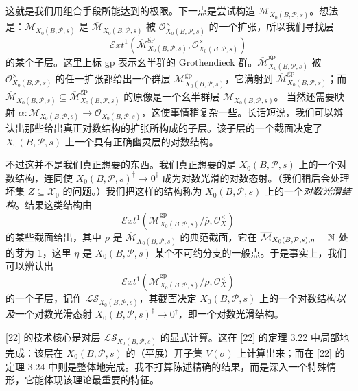 这就是我们用组合手段所能达到的极限。下一点是尝试构造 $\mathcal M_{X_0(B,\mathcal P,s)}$。想法是：$\mathcal M_{X_0(B,\mathcal P,s)}$ 是 $\overline{\mathcal M}_{X_0(B,\mathcal P,s)}$ 被 $\mathcal O^\times_{X_0(B,\mathcal P,s)}$ 的一个扩张，所以我们寻找层
\[
\mathcal Ext^1(\overline{\mathcal M}^{\mathrm{gp}}_{X_0(B,\mathcal P,s)},\mathcal O^\times_{X_0(B,\mathcal P,s)})
\]
的某个子层。这里上标 gp 表示幺半群的 Grothendieck 群。$\overline{\mathcal M}^{\mathrm{gp}}_{X_0(B,\mathcal P,s)}$ 被 $\mathcal O^\times_{X_0(B,\mathcal P,s)}$ 的任一扩张都给出一个群层 $\mathcal M^{\mathrm{gp}}_{X_0(B,\mathcal P,s)}$，它满射到 $\overline{\mathcal M}^{\mathrm{gp}}_{X_0(B,\mathcal P,s)}$；而 $\overline{\mathcal M}_{X_0(B,\mathcal P,s)}\subseteq\overline{\mathcal M}^{\mathrm{gp}}_{X_0(B,\mathcal P,s)}$ 的原像是一个幺半群层 $\mathcal M_{X_0(B,\mathcal P,s)}$。
当然还需要映射 $\alpha:\mathcal M_{X_0(B,\mathcal P,s)}\to\mathcal O_{X_0(B,\mathcal P,s)}$，这使事情稍复杂一些。长话短说，我们可以辨认出那些给出真正对数结构的扩张所构成的子层。该子层的一个截面决定了 $X_0(B,\mathcal P,s)$ 上一个具有正确幽灵层的对数结构。

不过这并不是我们真正想要的东西。我们真正想要的是 $X_0(B,\mathcal P,s)$ 上的一个对数结构，连同使 $X_0(B,\mathcal P,s)^\dagger\to0^\dagger$ 成为对数光滑的对数态射。（我们稍后会处理坏集 $Z\subseteq\mathcal X_0$ 的问题。）我们把这样的结构称为 $X_0(B,\mathcal P,s)$ 上的一个\emph{对数光滑结构}。结果这类结构由
\[
\mathcal Ext^1(\overline{\mathcal M}^{\mathrm{gp}}_{X_0(B,\mathcal P,s)}/\bar\rho,\mathcal O_X^\times)
\]
的某些截面给出，其中 $\bar\rho$ 是 $\overline{\mathcal M}_{X_0(B,\mathcal P,s)}$ 的典范截面，它在 $\overline{\mathcal M}_{X_0(B,\mathcal P,s),\eta}=\mathbb{N}$ 处的芽为 1，这里 $\eta$ 是 $X_0(B,\mathcal P,s)$ 某个不可约分支的一般点。于是事实上，我们可以辨认出
\[
\mathcal Ext^1(\overline{\mathcal M}^{\mathrm{gp}}_{X_0(B,\mathcal P,s)}/\bar\rho,\mathcal O_X^\times)
\]
的一个子层，记作 $\mathcal{LS}_{X_0(B,\mathcal P,s)}$，其截面决定 $X_0(B,\mathcal P,s)$ 上的一个对数结构\emph{以及}一个对数光滑态射 $X_0(B,\mathcal P,s)^\dagger\to0^\dagger$，即一个对数光滑结构。

[22] 的技术核心是对层 $\mathcal{LS}_{X_0(B,\mathcal P,s)}$ 的显式计算。这在 [22] 的定理 3.22 中局部地完成：该层在 $X_0(B,\mathcal P,s)$ 的（平展）开子集 $V(\sigma)$ 上计算出来；而在 [22] 的定理 3.24 中则是整体地完成。我不打算陈述精确的结果，而是深入一个特殊情形，它能体现该理论最重要的特征。

